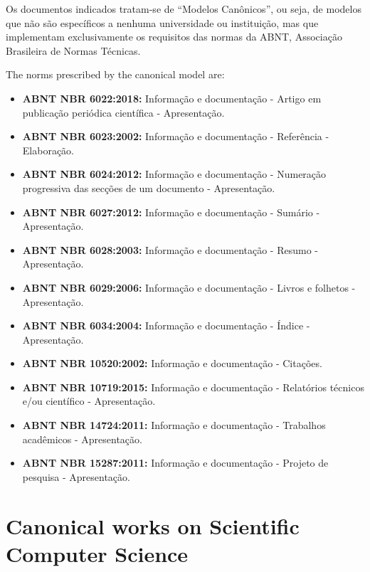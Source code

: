 \documentclass[
12pt,				%
openright,			%
oneside,			%
a4paper,			%
brazil,				%
english,			  %
]{abntex2}
\begin{document}
\begin{citacao}
  Os documentos indicados tratam-se de “Modelos Canônicos”, ou seja,
  de modelos que não são específicos a nenhuma universidade ou instituição, mas
  que implementam exclusivamente os requisitos das normas da ABNT, Associação
  Brasileira de Normas Técnicas. \cite[Cap. 1]{araujoclasse}
\end{citacao}


The norms prescribed by the canonical model are:

\begin{itemize}
\item \textbf{ABNT NBR 6022:2018:} Informação e documentação -
  Artigo em publicação periódica científica - Apresentação.
\item \textbf{ABNT NBR 6023:2002:} Informação e documentação -
  Referência - Elaboração.
\item \textbf{ABNT NBR 6024:2012:} Informação e documentação -
  Numeração progressiva das secções de um documento - Apresentação.
\item \textbf{ABNT NBR 6027:2012:} Informação e documentação -
  Sumário - Apresentação.
\item \textbf{ABNT NBR 6028:2003:} Informação e documentação -
  Resumo - Apresentação.
\item \textbf{ABNT NBR 6029:2006:} Informação e documentação -
  Livros e folhetos - Apresentação.
\item \textbf{ABNT NBR 6034:2004:} Informação e documentação -
  Índice - Apresentação.
\item \textbf{ABNT NBR 10520:2002:} Informação e documentação -
  Citações.
\item \textbf{ABNT NBR 10719:2015:} Informação e documentação -
  Relatórios técnicos e/ou científico - Apresentação.
\item \textbf{ABNT NBR 14724:2011:} Informação e documentação -
  Trabalhos acadêmicos - Apresentação.
\item \textbf{ABNT NBR 15287:2011:} Informação e documentação -
  Projeto de pesquisa - Apresentação.
\end{itemize}

\section{Canonical works on Scientific Computer Science}
\label{sec:scim}
\end{document}
